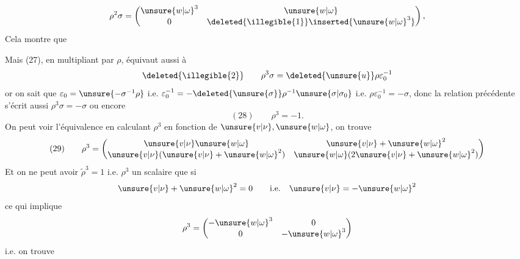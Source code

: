 

\[
\rho^2\sigma=\begin{pmatrix}\unsure{w|\omega}^3&\unsure{w|\omega}\\0&\deleted{\illegible{1}}\inserted{\unsure{w|\omega}^3}\end{pmatrix},
\]
Cela montre que
\inserted{
\[
(27\mathrm{bis})\qquad
\rho^2\sigma=\varepsilon_0^{-1}\Longleftrightarrow
\left\{\unsure{v|\nu}+\unsure{w|\omega}^2=0,\ \unsure{w|\omega}^3=1\right.
\quad
\left(\Rightarrow \unsure{v|\nu}=-\unsure{w|\omega}^2=-1/\unsure{w|\omega}\ \text{i.e.}\ \unsure{w|\omega}=-1/\unsure{v|\nu},\ \mathrm{OK}\right)
\]
}

Mais (27), en multipliant par $\rho$, équivaut aussi à
\[
\deleted{\illegible{2}}\qquad
\rho^3\sigma=\deleted{\unsure{u}}\rho\varepsilon_0^{-1}
\]
or on sait que $\varepsilon_0=\unsure{-\sigma^{-1}\rho}$  i.e. $\varepsilon_0^{-1}=-\deleted{\unsure{\sigma}}\rho^{-1}\unsure{\sigma|\sigma_0}$
i.e. $\rho\varepsilon_0^{-1}=-\sigma$, donc la relation précédente s'écrit aussi $\rho^3\sigma=-\sigma$ ou encore
\[
(28)\qquad \boxed{\rho^3=-1}.
\]
On peut voir  l'équivalence  en calculant $\rho^3$ en fonction de $\unsure{v|\nu},\unsure{w|\omega}$, on trouve
\[
(29)\qquad
\rho^3=\begin{pmatrix}\unsure{v|\nu}\unsure{w|\omega}&\unsure{v|\nu}+\unsure{w|\omega}^2\\\unsure{v|\nu}(\unsure{v|\nu}+\unsure{w|\omega}^2)&\unsure{w|\omega}(2\unsure{v|\nu}+\unsure{w|\omega}^2)\end{pmatrix}
\]
Et on ne peut avoir $\widetilde\rho^3=1$ i.e. $\rho^3$ un scalaire que si 
\[
\unsure{v|\nu}+\unsure{w|\omega}^2=0\qquad\text{i.e.}\quad \unsure{v|\nu}=-\unsure{w|\omega}^2
\]
ce qui implique
\[
\rho^3=\begin{pmatrix}-\unsure{w|\omega}^3&0\\0&-\unsure{w|\omega}^3\end{pmatrix}
\]
i.e. on trouve

